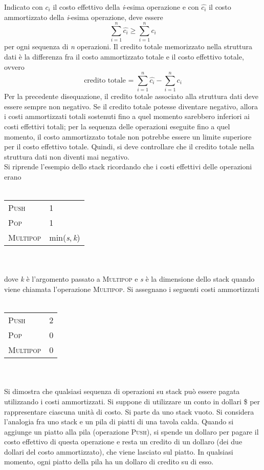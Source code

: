 \documentclass[10pt, a4paper]{report}
\begin{document}
Indicato con $c_i$ il costo effettivo della \textit{i}-esima operazione e con $\widehat{c_i}$ il costo ammortizzato della \textit{i}-esima operazione, deve essere
\begin{equation*}
\sum_{i=1}^{n}\widehat{c_i} \geq \sum_{i=1}^{n}c_i
\end{equation*}
per ogni sequenza di \textit{n} operazioni. Il credito totale memorizzato nella struttura dati è la differenza fra il costo ammortizzato totale e il costo effettivo totale, ovvero
\begin{equation*}
\text{credito totale = } \sum_{i=1}^{n}\widehat{c_i} - \sum_{i=1}^{n}c_i
\end{equation*}
Per la precedente disequazione, il credito totale associato alla struttura dati deve essere sempre non negativo. Se il credito totale potesse diventare negativo, allora i costi ammortizzati totali sostenuti fino a quel momento sarebbero inferiori ai costi effettivi totali; per la sequenza delle operazioni eseguite fino a quel momento, il costo ammortizzato totale non potrebbe essere un limite superiore per il costo effettivo totale. Quindi, si deve controllare che il credito totale nella struttura dati non diventi mai negativo.\\

Si riprende l'esempio dello stack ricordando che i costi effettivi delle operazioni erano\\\\
\begin{tabular}{ll}
\textsc{Push} &1\\
\textsc{Pop} &1\\
\textsc{Multipop} &min(\textit{s},\,\textit{k})
\end{tabular}
\\\\dove \textit{k} è l'argomento passato a \textsc{Multipop} e \textit{s} è la dimensione dello stack quando viene chiamata l'operazione \textsc{Multipop}. Si assegnano i seguenti costi ammortizzati\\\\
\begin{tabular}{ll}
\textsc{Push} &2\\
\textsc{Pop} &0\\
\textsc{Multipop} &0
\end{tabular}
\\\\Si dimostra che qualsiasi sequenza di operazioni su stack può essere pagata utilizzando i costi ammortizzati. Si suppone di utilizzare un conto in dollari \$ per rappresentare ciascuna unità di costo. Si parte da uno stack vuoto. Si considera l'analogia fra uno stack e un pila di piatti di una tavola calda. Quando si aggiunge un piatto alla pila (operazione \textsc{Push}), si spende un dollaro per pagare il costo effettivo di questa operazione e resta un credito di un dollaro (dei due dollari del costo ammortizzato), che viene lasciato sul piatto. In qualsiasi momento, ogni piatto della pila ha un dollaro di credito su di esso.
\end{document}
